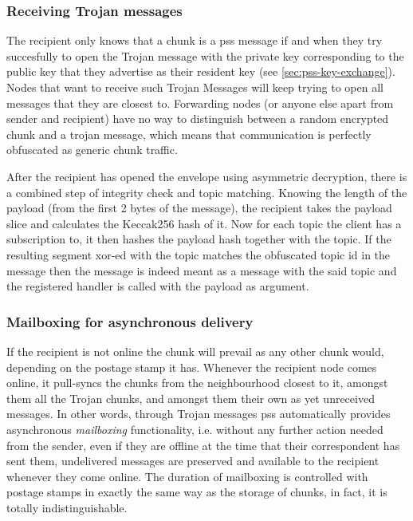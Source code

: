 \subsubsection{Receiving Trojan messages}

The recipient only knows that a chunk is a pss message if and when they try succesfully to open the Trojan message with the private key corresponding to the public key that they advertise as their resident key (see \ref{sec:pss-key-exchange}). Nodes that want to receive such Trojan Messages will keep trying to open all messages that they are closest to. Forwarding nodes (or anyone else apart from sender and recipient) have no way to distinguish between a random encrypted chunk and a trojan message, which means that communication is perfectly obfuscated as generic chunk traffic.

After the recipient has opened the envelope using asymmetric decryption, there is a combined step of integrity check and topic matching. Knowing the length of the payload (from the first 2 bytes of the message), the recipient takes the payload slice and calculates the Keccak256 hash of it. Now for each topic the client has a subscription to, it then hashes the payload hash together with the topic. If the resulting segment xor-ed with the topic matches the obfuscated topic id in the message then the message is indeed meant as a message with the said topic and the registered handler is called with the payload as argument.

\subsubsection{Mailboxing for asynchronous delivery}

If the recipient is not online the chunk will prevail as any other chunk would, depending on the postage stamp it has. Whenever the recipient node comes online, it pull-syncs the chunks from the neighbourhood closest to it, amongst them all the Trojan chunks, and amongst them their own as yet unreceived messages. In other words, through Trojan messages pss automatically provides asynchronous \emph{mailboxing} functionality, i.e. 
without any further action needed from the sender, even if they are offline at the time that their correspondent has sent them, undelivered messages are preserved and available to the recipient whenever they come online. The duration of mailboxing is controlled with postage stamps in exactly the same way as the storage of chunks, in fact, it is totally indistinguishable.

